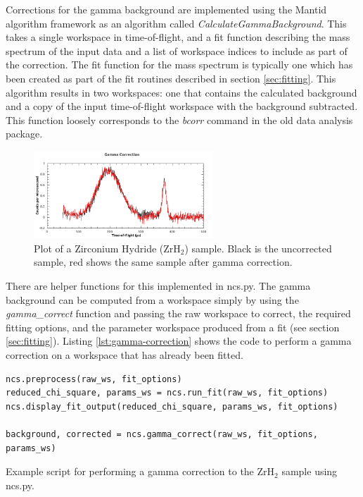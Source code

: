 \documentclass[paper=a4, fontsize=11pt]{scrartcl}	%
\numberwithin{equation}{section}															%
\numberwithin{figure}{section}																%
\numberwithin{table}{section}
\begin{document}
Corrections for the gamma background are implemented using the Mantid algorithm framework as an algorithm called \textit{CalculateGammaBackground}. This takes a single workspace in time-of-flight, and a fit function describing the mass spectrum of the input data and a list of workspace indices to include as part of the correction. The fit function for the mass spectrum is typically one which has been created as part of the fit routines described in section \ref{sec:fitting}. This algorithm results in two workspaces: one that contains the calculated background and a copy of the input time-of-flight workspace with the background subtracted. This function loosely corresponds to the \textit{bcorr} command in the old data analysis package.

\begin{figure}[H]
\centering
\includegraphics[width=0.6\textwidth]{img/corrections-gamma.png}
\caption{Plot of a Zirconium Hydride (ZrH$_2$) sample. Black is the uncorrected sample, red shows the same sample after gamma correction.}
\label{fig:corrections-gamma}
\end{figure}

There are helper functions for this implemented in ncs.py. The gamma background can be computed from a workspace simply by using the \textit{gamma\_correct} function and passing the raw workspace to correct, the required fitting options, and the parameter workspace produced from a fit (see section \ref{sec:fitting}). Listing \ref{lst:gamma-correction} shows the code to perform a gamma correction on a workspace that has already been fitted.

\begin{listing}[H]
\begin{verbatim}
ncs.preprocess(raw_ws, fit_options)
reduced_chi_square, params_ws = ncs.run_fit(raw_ws, fit_options)
ncs.display_fit_output(reduced_chi_square, params_ws, fit_options)

background, corrected = ncs.gamma_correct(raw_ws, fit_options, params_ws)
\end{verbatim}
\caption{Example script for performing a gamma correction to the ZrH$_2$ sample using ncs.py.}
\label{lst:gamma-correction}
\end{listing}
\end{document}
